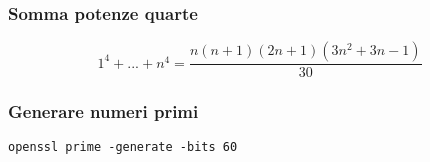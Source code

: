 \subsubsection{Somma potenze quarte}
$$ 1^4+...+n^4=\frac{n(n+1)(2n+1)(3n^2+3n-1)}{30} $$

\subsubsection{Generare numeri primi}
\begin{center}
\verb|openssl prime -generate -bits 60|
\end{center}
